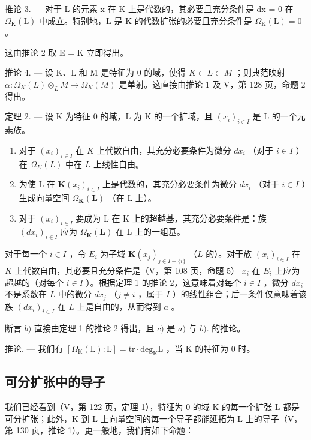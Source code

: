 推论 3. --- 对于 L 的元素 x 在 K 上是代数的，其必要且充分条件是 dx = 0 在 \(\Omega_{\mathrm{K}}(\mathrm{L})\) 中成立。特别地，L 是 K 的代数扩张的必要且充分条件是 \(\Omega_{\mathrm{K}}(\mathrm{L}) = 0\) 。

这由推论 2 取 E = K 立即得出。

推论 4. --- 设 K、L 和 M 是特征为 0 的域，使得 \(K \subset L \subset M\) ；则典范映射 \(\alpha: \Omega_{K}(L) \otimes_{L} M \to \Omega_{K}(M)\) 是单射。这直接由推论 1 及 V，第 128 页，命题 2 得出。

定理 2. --- 设 K 为特征 0 的域，L 为 K 的一个扩域，且 \((x_{i})_{i\in I}\) 是 L 的一个元素族。

\begin{enumerate}
\def\labelenumi{\alph{enumi})}
\item
  对于 \((x_{i})_{i\in I}\) 在 \(K\) 上代数自由，其充分必要条件为微分 \(dx_{i}\) （对于 \(i\in I\) ）在 \(\Omega_K(L)\) 中在 \(L\) 上线性自由。
\item
  为使 L 在 \(\mathbf{K}(x_{i})_{i\in I}\) 上是代数的，其充分必要条件为微分 \(dx_{i}\) （对于 \(i\in I\) ）生成向量空间 \(\Omega_{\mathbf{K}}(\mathbf{L})\) （在 L 上）。
\item
  对于 \((x_{i})_{i\in I}\) 要成为 L 在 K 上的超越基，其充分必要条件是：族 \((dx_{i})_{i\in I}\) 应为 \(\Omega_{\mathbf{K}}(\mathbf{L})\) 在 L 上的一组基。
\end{enumerate}

对于每一个 \(i \in I\) ，令 \(E_i\) 为子域 \(\mathbf{K}(x_j)_{j \in I - \{i\}}\) （\(L\) 的）。对于族 \((x_i)_{i \in I}\) 在 \(K\) 上代数自由，其必要且充分条件是（V，第 108 页，命题 5） \(x_i\) 在 \(E_i\) 上应为超越的（对每个 \(i \in I\) ）。根据定理 1 的推论 2，这意味着对每个 \(i \in I\) ，微分 \(dx_i\) 不是系数在 \(L\) 中的微分 \(dx_j\) （\(j \neq i\) ，属于 \(I\) ）的线性组合；后一条件仅意味着该族 \((dx_i)_{i \in I}\) 在 \(L\) 上是自由的，从而得到 \(a\) 。

断言 \(b)\) 直接由定理 1 的推论 2 得出，且 \(c)\) 是 \(a)\) 与 \(b).\) 的推论。

推论. --- 我们有 \([\Omega_{\mathrm{K}}(\mathrm{L}):\mathrm{L}]=\mathrm{tr}\cdot\mathrm{deg}_{\mathrm{K}}\mathrm{L}\) ，当 K 的特征为 0 时。

\subsection{可分扩张中的导子}

我们已经看到（V，第 122 页，定理 1），特征为 0 的域 K 的每一个扩张 L 都是可分扩张；此外，K 到 L 上向量空间的每一个导子都能延拓为 L 上的导子（V，第 130 页，推论 1）。更一般地，我们有如下命题：

